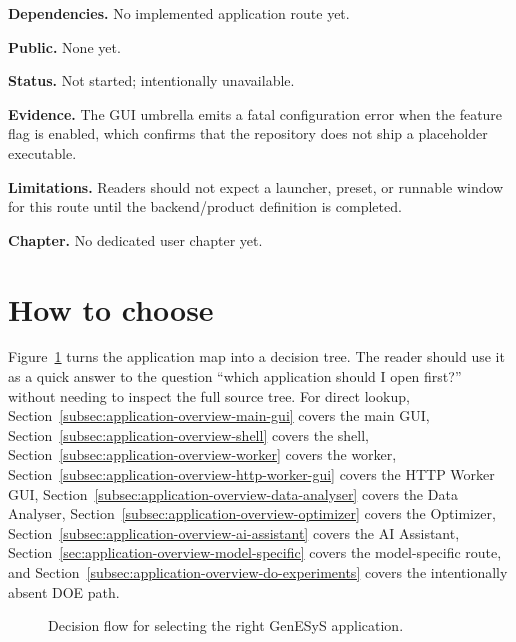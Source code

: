 \noindent\textbf{Dependencies.} No implemented application route yet.

\noindent\textbf{Public.} None yet.

\noindent\textbf{Status.} Not started; intentionally unavailable.

\noindent\textbf{Evidence.} The GUI umbrella emits a fatal configuration error when the feature flag is enabled, which confirms that the repository does not ship a placeholder executable.

\noindent\textbf{Limitations.} Readers should not expect a launcher, preset, or runnable window for this route until the backend/product definition is completed.

\noindent\textbf{Chapter.} No dedicated user chapter yet.

\section{How to choose}
\label{sec:application-overview-choice}

Figure~\ref{fig:application-choice-flow} turns the application map into a
decision tree. The reader should use it as a quick answer to the question
``which application should I open first?'' without needing to inspect the full
source tree. For direct lookup, Section~\ref{subsec:application-overview-main-gui}
covers the main GUI, Section~\ref{subsec:application-overview-shell} covers the
shell, Section~\ref{subsec:application-overview-worker} covers the worker,
Section~\ref{subsec:application-overview-http-worker-gui} covers the HTTP
Worker GUI, Section~\ref{subsec:application-overview-data-analyser} covers the
Data Analyser, Section~\ref{subsec:application-overview-optimizer} covers the
Optimizer, Section~\ref{subsec:application-overview-ai-assistant} covers the
AI Assistant, Section~\ref{sec:application-overview-model-specific} covers
the model-specific route, and Section~\ref{subsec:application-overview-do-experiments}
covers the intentionally absent DOE path.

\begin{figure}[htbp]
\centering
{}
\caption{Decision flow for selecting the right GenESyS application.}
\label{fig:application-choice-flow}
\end{figure}

